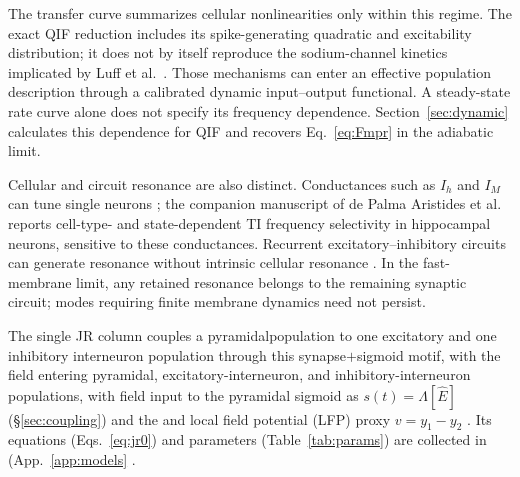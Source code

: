 \documentclass[11pt,a4paper]{article}
\providecommand{\DIFaddtex}[1]{{\protect\color{blue} \sf #1}} %
\providecommand{\DIFdeltex}[1]{{\protect\color{red} \scriptsize #1}} %
\providecommand{\DIFaddbegin}{} %
\providecommand{\DIFaddend}{} %
\providecommand{\DIFdelbegin}{} %
\providecommand{\DIFdelend}{} %
\providecommand{\DIFadd}[1]{\texorpdfstring{\DIFaddtex{#1}}{#1}} %
\providecommand{\DIFdel}[1]{\texorpdfstring{\DIFdeltex{#1}}{}} %
\begin{document}
\DIFaddbegin \DIFadd{The transfer curve summarizes cellular nonlinearities only within this regime.
The exact QIF reduction includes its spike-generating quadratic and excitability
distribution; it does not by itself reproduce the sodium-channel kinetics implicated
by Luff et al.\ \cite{luff2024mixer}. Those mechanisms can enter an effective
population description through a calibrated dynamic input--output functional.
A steady-state rate curve alone does not specify its frequency dependence.
Section~\ref{sec:dynamic} calculates this dependence for QIF and recovers
Eq.~\eqref{eq:Fmpr} in the adiabatic limit.
}

\DIFadd{Cellular and circuit resonance are also distinct. Conductances such as $I_h$ and
$I_M$ can tune single neurons \cite{hutcheonyarom2000}; the companion manuscript of
de Palma Aristides et al.\ \cite{depalma2026ti} reports cell-type- and state-dependent
TI frequency selectivity in hippocampal neurons, sensitive to these conductances.
Recurrent excitatory--inhibitory circuits can generate resonance without intrinsic
cellular resonance \cite{brunelhakim1999,brunelwang2003}. In the fast-membrane limit,
any retained resonance belongs to the remaining synaptic circuit; modes requiring
finite membrane dynamics need not persist.
}

\DIFaddend The \DIFdelbegin \DIFdel{single }\DIFdelend JR column couples \DIFdelbegin \DIFdel{a pyramidalpopulation to one excitatory and one inhibitory
interneuron population through this synapse$+$sigmoid motif, with the field entering }\DIFdelend \DIFaddbegin \DIFadd{pyramidal, excitatory-interneuron, and inhibitory-interneuron
populations, with field input to }\DIFaddend the pyramidal sigmoid \DIFdelbegin \DIFdel{as $s(t)=\Lambda[\hat E]$ (\S\ref{sec:coupling}) and the }\DIFdelend \DIFaddbegin \DIFadd{and }\DIFaddend local field potential
(LFP) proxy $v=y_1-y_2$ \DIFdelbegin \DIFdel{. Its equations (Eqs.~\eqref{eq:jr0}) and parameters (Table~\ref{tab:params}) are
collected in }\DIFdelend \DIFaddbegin \DIFadd{(}\DIFaddend App.~\ref{app:models}\DIFdelbegin \DIFdel{.
}%
\end{document}
